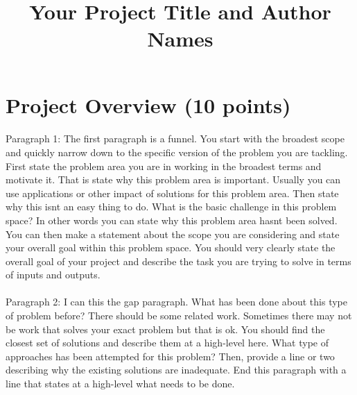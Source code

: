 \documentclass[11pt,a4paper]{article}
\begin{document}
\title{Your Project Title and Author Names}



\maketitle
\section{Project Overview (10 points)}

\paragraph{}Paragraph 1: The first paragraph is a funnel. You start with the broadest scope and quickly narrow down to the specific version of the problem you are tackling. 
First state the problem area you are in working in the broadest terms and motivate it. That is state why this problem area is important. Usually you can use applications or other impact of solutions for this problem area.  Then state why this isnt an easy thing to do. What is the basic challenge in this problem space? In other words you can state why this problem area hasnt been solved. 
You can then make a statement about the scope you are considering and state your overall goal within this problem space. You should very clearly state  the overall goal of your project and describe the task you are trying to solve in terms of inputs and outputs.  


\paragraph{}Paragraph 2: I can this the gap paragraph. What has been done about this type of problem before? There should be some related work. Sometimes there may not be work that solves your exact problem but that is ok. You should find the closest set of solutions and describe them at a high-level here.  What type of approaches has been attempted for this problem? Then, provide a line or two describing why the existing solutions are inadequate. 
End this paragraph with a line that states at a high-level what needs to be done. 
\end{document}
